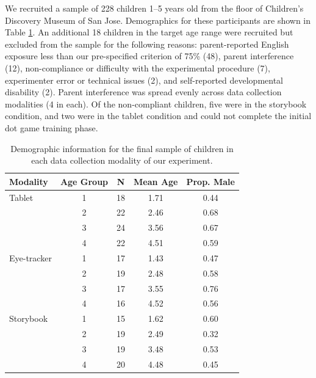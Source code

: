 \documentclass[man,noapacite]{apa2}
\begin{document}

We recruited a sample of 228 children 1--5 years old from the floor of Children's Discovery Museum of San Jose. Demographics for these participants are shown in Table \ref{tab:demo}. An additional 18 children in the target age range were recruited but excluded from the sample for the following reasons: parent-reported English exposure less than our pre-specified criterion of 75\% (48), parent interference (12), non-compliance or difficulty with the experimental procedure (7), experimenter error or technical issues (2), and self-reported developmental disability (2). Parent interference was spread evenly across data collection modalities (4 in each). Of the non-compliant children, five were in the storybook condition, and two were in the tablet condition and could not complete the initial dot game training phase.  

\begin{table}[ht]
\centering
\caption{\label{tab:demo} Demographic information for the final sample of children in each data collection modality of our experiment.}
\begin{tabular}{lcccc}
  \hline
 Modality & Age Group & N & Mean Age & Prop. Male \\ 
  \hline
Tablet  & 1 &  18 & 1.71 & 0.44 \\ 
           & 2 &  22 & 2.46 & 0.68 \\ 
           & 3 &  24 & 3.56 & 0.67 \\ 
           & 4 &  22 & 4.51 & 0.59 \\  
Eye-tracker & 1 &  17 & 1.43 & 0.47 \\ 
           & 2 &  19 & 2.48 & 0.58 \\ 
           & 3 &  17 & 3.55 & 0.76 \\ 
           & 4 &  16 & 4.52 & 0.56 \\ 
Storybook & 1 &  15 & 1.62 & 0.60 \\ 
           & 2 &  19 & 2.49 & 0.32 \\ 
           & 3 &  19 & 3.48 & 0.53 \\ 
           & 4 &  20 & 4.48 & 0.45 \\ 
   \hline
\end{tabular}
\end{table}
\end{document}
